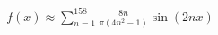 \documentclass[preview]{standalone}
\begin{document}
\begin{align*}
f(x) \approx \sum_{n=1}^{158} \frac{8n}{\pi(4n^2-1)} \sin(2nx)
\end{align*}
\end{document}
